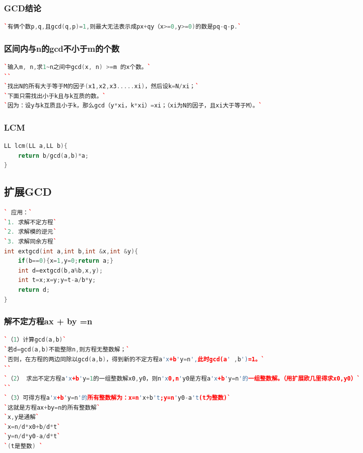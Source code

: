 \documentclass[a4paper]{article}
\begin{document}
\begin{CJK*}{UTF8}{gbsn}
\begin{multicols}{3}
\begin{flushleft}
\subsubsection{GCD结论}
\begin{lstlisting}[language={c++}]
`有俩个数p,q,且gcd(q,p)=1,则最大无法表示成px+qy（x>=0,y>=0)的数是pq-q-p.`
\end{lstlisting}

\subsubsection{区间内与n的gcd不小于m的个数 }
\begin{lstlisting}[language={c++}]
`输入m, n,求1~n之间中gcd(x, n) >=m 的x个数。`
``
`找出N的所有大于等于M的因子(x1,x2,x3.....xi)，然后设k=N/xi；`
`下面只需找出小于k且与k互质的数。`
`因为：设y与k互质且小于k，那么gcd（y*xi，k*xi）=xi；（xi为N的因子，且xi大于等于M）。`
\end{lstlisting}

\subsubsection{LCM}
\begin{lstlisting}[language={c++}]
LL lcm(LL a,LL b){
    return b/gcd(a,b)*a;
}
\end{lstlisting}


\subsection{扩展GCD}
\begin{lstlisting}[language={c++}]
` 应用：`
`1. 求解不定方程`
`2. 求解模的逆元`
`3. 求解同余方程`
int extgcd(int a,int b,int &x,int &y){
	if(b==0){x=1,y=0;return a;}
	int d=extgcd(b,a%b,x,y);
	int t=x;x=y;y=t-a/b*y;
	return d;
}
\end{lstlisting}


\subsubsection{解不定方程ax + by =n}
\begin{lstlisting}[language={c++}]
`（1）计算gcd(a,b)`
`若d=gcd(a,b)不能整除n,则方程无整数解；`
`否则，在方程的两边同除以gcd(a,b)，得到新的不定方程a'x+b'y=n',此时gcd(a' ,b')=1。`
``
`（2） 求出不定方程a'x+b'y=1的一组整数解x0,y0，则n'x0,n'y0是方程a'x+b'y=n'的一组整数解。（用扩展欧几里得求x0,y0）`
``
`（3）可得方程a'x+b'y=n'的所有整数解为：x=n'x+b't;y=n'y0-a't(t为整数)`
`这就是方程ax+by=n的所有整数解`
`x,y是通解`
`x=n/d*x0+b/d*t`
`y=n/d*y0-a/d*t`
`(t是整数) `
\end{lstlisting}




\end{flushleft}
\end{multicols}
\end{CJK*}
\end{document}
